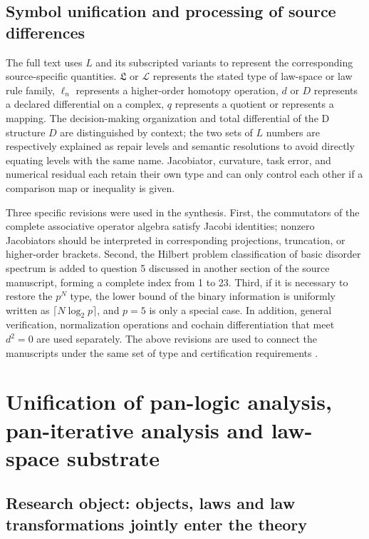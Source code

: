 \documentclass[11pt,a4paper]{article}
\theoremstyle{plain}
\theoremstyle{definition}
\theoremstyle{remark}
\begin{document}
\begin{CJK*}
\subsection { Symbol unification and processing of source differences } The full text uses $L$ and its subscripted variants to represent the corresponding source-specific quantities. $\mathfrak L$ or $\mathcal L$ represents the stated type of law-space or law rule family, $\ell_n$ represents a higher-order homotopy operation, $d$ or $D$ represents a declared differential on a complex, $q$ represents a quotient or represents a mapping. The decision-making organization and total differential of the D structure $D$ are distinguished by context; the two sets of $L$ numbers are respectively explained as repair levels and semantic resolutions to avoid directly equating levels with the same name. Jacobiator, curvature, task error, and numerical residual each retain their own type and can only control each other if a comparison map or inequality is given.

Three specific revisions were used in the synthesis. First, the commutators of the complete associative operator algebra satisfy Jacobi identities; nonzero Jacobiators should be interpreted in corresponding projections, truncation, or higher-order brackets. Second, the Hilbert problem classification of basic disorder spectrum is added to question 5 discussed in another section of the source manuscript, forming a complete index from 1 to 23. Third, if it is necessary to restore the $p^N$ type, the lower bound of the binary information is uniformly written as $\lceil N\log_2p\rceil$, and $p=5$ is only a special case. In addition, general verification, normalization operations and cochain differentiation that meet $d^2=0$ are used separately. The above revisions are used to connect the manuscripts under the same set of type and certification requirements \cite{S01,S27,S37,S38}.

 \section { Unification of pan-logic analysis, pan-iterative analysis and law-space substrate }\label{fa:foundation}


\subsection { Research object: objects, laws and law transformations jointly enter the theory }


\end{CJK*}
\end{document}
